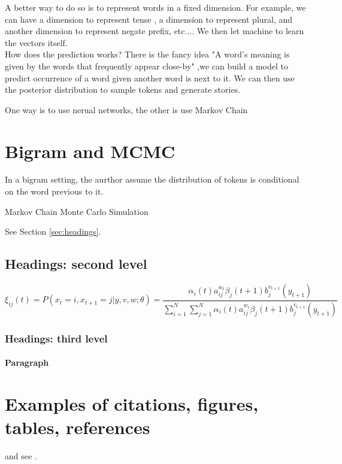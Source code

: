 \documentclass{article}
\begin{document}
A better way to do so is to represent words in a fixed dimension. For example, we can have a dimension to represent tense , a dimension to represent plural, 
and another dimension to represent negate prefix, etc....  We then let machine to learn the vectors itself.
$$$$
How does the prediction works? There is the fancy idea "A word’s meaning is given by the words that frequently appear close-by" ,we can build a model to predict occurrence of a word given another word is next to it. We can then use the posterior distribution to sample tokens and generate stories.

One way is to use nerual networks, the other is use Markov Chain

\section{Bigram and MCMC}
In a bigram setting, the aurthor assume the distribution of tokens is conditional on the word previous to it. 
 \cite{Event representations for automated story generation}



Markov Chain Monte Carlo Simulation
\label{sec:headings}

\lipsum[4] See Section \ref{sec:headings}.

\subsection{Headings: second level}
\lipsum[5]
\begin{equation}
\xi _{ij}(t)=P(x_{t}=i,x_{t+1}=j|y,v,w;\theta)= {\frac {\alpha _{i}(t)a^{w_t}_{ij}\beta _{j}(t+1)b^{v_{t+1}}_{j}(y_{t+1})}{\sum _{i=1}^{N} \sum _{j=1}^{N} \alpha _{i}(t)a^{w_t}_{ij}\beta _{j}(t+1)b^{v_{t+1}}_{j}(y_{t+1})}}
\end{equation}

\subsubsection{Headings: third level}
\lipsum[6]

\paragraph{Paragraph}
\lipsum[7]

\section{Examples of citations, figures, tables, references}
\label{sec:others}
\lipsum[8] \cite{kour2014real,kour2014fast} and see \cite{hadash2018estimate}.
\end{document}
